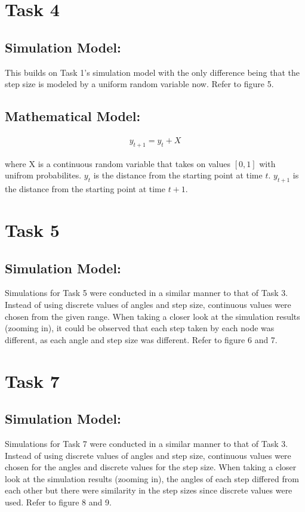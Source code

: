 \documentclass[10pt, a4paper]{article}
\begin{document}
\section*{Task 4}
\subsection*{Simulation Model:}
This builds on Task 1's simulation model with the only difference being that the step size is modeled by a uniform random variable now.
Refer to figure 5.

\subsection*{Mathematical Model:}
\begin{align*}
    y_{t+1} = y_{t} + X
\end{align*}

where X is a continuous random variable that takes on values $[0, 1]$ with unifrom probabilites.
$y_t$ is the distance from the starting point at time $t$. $y_{t+1}$ is the distance from the starting point at time $t+1$.


\section*{Task 5}
\subsection*{Simulation Model:}
Simulations for Task 5 were conducted in a similar manner to that of Task 3. Instead of using discrete values of angles and step size, continuous values were chosen from the given range. When taking a closer look at the simulation results (zooming in), it could be observed that each step taken by each node was different, as each angle and step size was different. 
Refer to figure 6 and 7.


\section*{Task 7}
\subsection*{Simulation Model:}
Simulations for Task 7 were conducted in a similar manner to that of Task 3. Instead of using discrete values of angles and step size, continuous values were chosen for the angles and discrete values for the step size. When taking a closer look at the simulation results (zooming in), the angles of each step differed from each other but there were similarity in the step sizes since discrete values were used.
Refer to figure 8 and 9.
\end{document}
